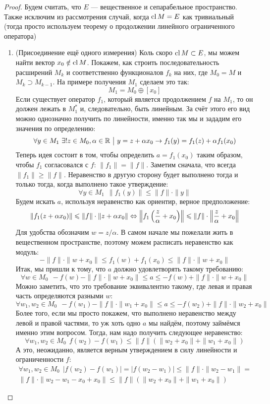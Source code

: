 \begin{proof}
	Будем считать, что $E$ --- вещественное и сепарабельное пространство. Также исключим из рассмотрения случай, когда $\operatorname{cl} M = E$ как тривиальный (тогда просто используем теорему о продолжении линейного ограниченного оператора)
	\begin{enumerate}
		\item (Присоединение ещё одного измерения) Коль скоро $\operatorname{cl} M \subset E$, мы можем найти вектор $x_0 \notin \operatorname{cl} M$. Покажем, как строить последовательность расширений $M_k$ и соответственно функционалов $f_k$ на них, где $M_0 = M$ и $M_k \supset M_{k - 1}$. На примере получения $M_1$ сделаем это так:
		\[
			M_1 = M_0 \oplus [x_0]
		\]
		Если существует оператор $f_1$, который является продолжением $f$ на $M_1$, то он должен лежать в $M_1^*$ и, следовательно, быть линейным. За счёт этого его вид можно однозначно получить по линейности, именно так мы и зададим его значения по определению:
		\[
			\forall y \in M_1\ \exists! z \in M_0, \alpha \in \mathbb{R} \ \big|\  y = z + \alpha x_0 \rightarrow f_1(y) = f_1(z) + \alpha f_1(x_0)
		\]
		Теперь идея состоит в том, чтобы определить $a = f_1(x_0)$ таким образом, чтобы $f_1$ согласовался с $f$: $\|f_1\| = \|f\|$. Заметим сначала, что всегда $\|f_1\| \ge \|f\|$. Неравенство в другую сторону будет выполнено тогда и только тогда, когда выполнено такое утверждение:
		\[
			\forall y \in M_1\ \ \|f_1(y)\| \le \|f\| \cdot \|y\|
		\]
		Будем искать $a$, используя неравенство как ориентир, верное предположение:
		\[
			\|f_1(z + \alpha x_0)\| \leqslant \|f\| \cdot \|z + \alpha x_0\| \Leftrightarrow \left\|f_1\left(\frac{z}{\alpha} + x_0\right)\right\| \leqslant \|f\| \cdot \left\|\frac{z}{\alpha} + x_0\right\|
		\]
		Для удобства обозначим $w = z / \alpha$. В самом начале мы пожелали жить в вещественном пространстве, поэтому можем расписать неравенство как модуль:
		\[
			-\|f\| \cdot \|w + x_0\| \le f_1(w) + f_1(x_0) \le \|f\| \cdot \|w + x_0\|
		\]
		Итак, мы пришли к тому, что $a$ должно удовлетворять такому требованию:
		\[
			\forall w \in M_0\ \ -f(w) - \|f\| \cdot \|w + x_0\| \le a \le -f(w) + \|f\| \cdot \|w + x_0\|
		\]
		Можно заметить, что это требование эквивалентно такому, где левая и правая часть определяются разными $w$:
		\[
			\forall w_1, w_2 \in M_0\ \ -f(w_1) - \|f\| \cdot \|w_1 + x_0\| \le a \le -f(w_2) + \|f\| \cdot \|w_2 + x_0\|
		\]
		Более того, если мы просто покажем, что выполнено неравенство между левой и правой частями, то уж хоть одно $a$ мы найдём, поэтому займёмся именно этим вопросом. Тогда, нам надо получить следующее неравенство:
		\[
			\forall w_1, w_2 \in M_0\ \ f(w_2) - f(w_1) \le \|f\|(\|w_2 + x_0\| + \|w_1 + x_0\|)
		\]
		А это, неожиданно, является верным утверждением в силу линейности и ограниченности $f$:
		\begin{multline*}
			\forall w_1, w_2 \in M_0\ \ |f(w_2) - f(w_1)| = |f(w_2 - w_1)| \le \|f\| \cdot \|w_2 - w_1\| =
			\\
			\|f\| \cdot \|w_2 - w_1 - x_0 + x_0\| \le \|f\|(\|w_2 + x_0\| + \|w_1 + x_0\|)
		\end{multline*}
		

\end{enumerate}
\end{proof}
